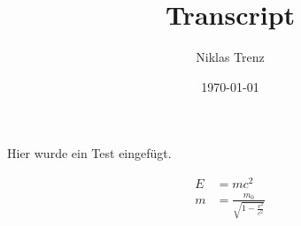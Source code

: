 \documentclass[a4paper,12pt]{article}
\title{Transcript}
\author{Niklas Trenz}
\date{\today}
\begin{document}
    \maketitle
    \tableofcontents

    Hier wurde ein Test eingefügt.

    


    \begin{align}
        E &= mc^2                   \\
        m &= \frac{m_0}{\sqrt{1-\frac{v^2}{c^2}}}
    \end{align}
\end{document}
